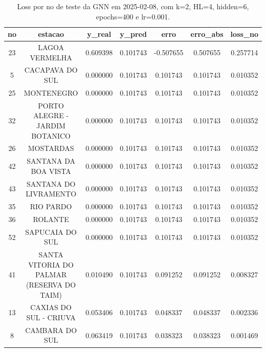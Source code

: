 \begin{table}[h]
\centering
\caption{Loss por no de teste da GNN em 2025-02-08, com k=2, HL=4, hidden=6, epochs=400 e lr=0.001.}
\label{tab:gnn_loss_k2_hl4_h6_e400_d20250208}
\begin{tabular}{ccccccc}
\toprule
no & estacao & y\_real & y\_pred & erro & erro\_abs & loss\_no \\
\midrule
23 & LAGOA VERMELHA & 0.609398 & 0.101743 & -0.507655 & 0.507655 & 0.257714 \\
5 & CACAPAVA DO SUL & 0.000000 & 0.101743 & 0.101743 & 0.101743 & 0.010352 \\
25 & MONTENEGRO & 0.000000 & 0.101743 & 0.101743 & 0.101743 & 0.010352 \\
32 & PORTO ALEGRE - JARDIM BOTANICO & 0.000000 & 0.101743 & 0.101743 & 0.101743 & 0.010352 \\
26 & MOSTARDAS & 0.000000 & 0.101743 & 0.101743 & 0.101743 & 0.010352 \\
42 & SANTANA DA BOA VISTA & 0.000000 & 0.101743 & 0.101743 & 0.101743 & 0.010352 \\
43 & SANTANA DO LIVRAMENTO & 0.000000 & 0.101743 & 0.101743 & 0.101743 & 0.010352 \\
35 & RIO PARDO & 0.000000 & 0.101743 & 0.101743 & 0.101743 & 0.010352 \\
36 & ROLANTE & 0.000000 & 0.101743 & 0.101743 & 0.101743 & 0.010352 \\
52 & SAPUCAIA DO SUL & 0.000000 & 0.101743 & 0.101743 & 0.101743 & 0.010352 \\
41 & SANTA VITORIA DO PALMAR (RESERVA DO TAIM) & 0.010490 & 0.101743 & 0.091252 & 0.091252 & 0.008327 \\
13 & CAXIAS DO SUL - CRIUVA & 0.053406 & 0.101743 & 0.048337 & 0.048337 & 0.002336 \\
8 & CAMBARA DO SUL & 0.063419 & 0.101743 & 0.038323 & 0.038323 & 0.001469 \\
\bottomrule
\end{tabular}
\end{table}
